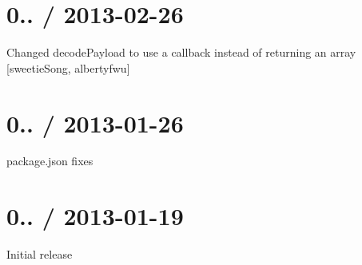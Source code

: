 \section*{0.. / 2013-\/02-\/26 }


\begin{DoxyItemize}
\item Changed {\ttfamily decode\+Payload} to use a callback instead of returning an array \mbox{[}sweetie\+Song, albertyfwu\mbox{]}
\end{DoxyItemize}

\section*{0.. / 2013-\/01-\/26 }


\begin{DoxyItemize}
\item package.\+json fixes
\end{DoxyItemize}

\section*{0.. / 2013-\/01-\/19 }


\begin{DoxyItemize}
\item Initial release 
\end{DoxyItemize}